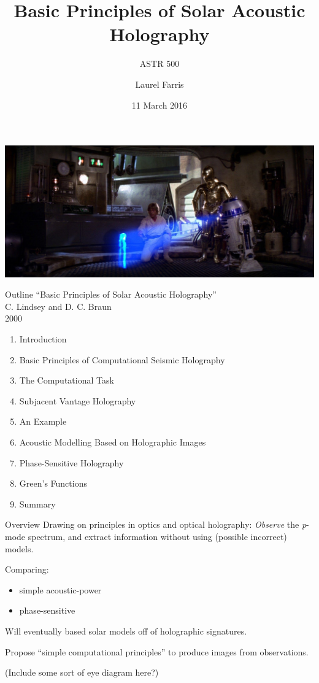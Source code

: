 \documentclass{beamer}
\title{Basic Principles of Solar Acoustic Holography}
\subtitle{ASTR 500}
\date{11 March 2016}
\author{Laurel Farris}
\begin{document}
\begin{frame}
    \titlepage{}
    \includegraphics[width=\paperwidth]{starwars.jpg}
\end{frame}

\begin{frame}{Outline}
``Basic Principles of Solar Acoustic Holography''\\
C. Lindsey and D. C. Braun\\
2000
    \begin{enumerate}
        \item Introduction
        \item Basic Principles of Computational Seismic Holography
        \item The Computational Task
        \item Subjacent Vantage Holography
        \item An Example
        \item Acoustic Modelling Based on Holographic Images
        \item Phase-Sensitive Holography
        \item Green's Functions
        \item Summary
    \end{enumerate}
\end{frame}

\begin{frame}{Overview}
    Drawing on principles in optics and optical holography:
    \emph{Observe} the \emph{p}-mode spectrum, and extract
    information without using (possible incorrect) models.

    Comparing:
    \begin{itemize}
        \item simple acoustic-power
        \item phase-sensitive
    \end{itemize}
    Will eventually based solar models off of holographic signatures.

    Propose ``simple computational principles'' to produce images
    from observations.

    (Include some sort of eye diagram here?)

\end{frame}
\end{document}
